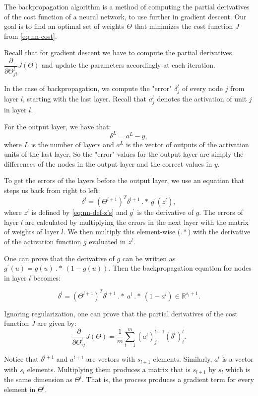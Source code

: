 \documentclass[a4paper,11pt]{report}
\begin{document}
The backpropagation algorithm is a method of computing the partial derivatives of the cost function of a neural network, to use further in gradient descent. Our goal is to find an optimal set of weights $\Theta$ that minimizes the cost function $J$ from \eqref{eq:nn-cost}.

Recall that for gradient descent we have to compute the partial derivatives $\dfrac{\partial}{\partial\Theta^l_{ji}}J(\Theta)$ and update the parameters accordingly at each iteration.

In the case of backpropagation, we compute the "error" $\delta_j^{l}$ of every node $j$ from layer $l$, starting with the last layer. Recall that $a_j^l$ denotes the activation of unit $j$ in layer $l$.

For the output layer, we have that: $$\delta^{L} = a^{L} - y,$$
where $L$ is the number of layers and $a^{L}$ is the vector of outputs of the activation units of the last layer. So the "error" values for the output layer are simply the differences of the nodes in the output layer and the correct values in $y$.

To get the errors of the layers before the output layer, we use an equation that steps us back from right to left:
$$\delta^{l} = (\Theta^{l+1})^T \delta^{l+1}\ .*\ g^\prime(z^{l}),$$
where $z^l$ is defined by \eqref{eq:nn-def-z's} and $g^\prime$ is the derivative of $g$.
The errors of layer $l$ are calculated by multiplying the errors in the next layer with the matrix of weights of layer $l$. We then multiply this element-wise ($.*$) with the derivative of the activation function $g$ evaluated in $z^l$.

One can prove that the derivative of $g$ can be written as $g^\prime(u) = g(u)\ .*\ (1 - g(u))$. Then the backpropagation equation for nodes in layer $l$ becomes:

\begin{equation}\label{eq:nn-bkprp-eq}
\delta^{l} = (\Theta^{l+1})^T \delta^{l+1}\ .*\ a^{l}\ .*\ (1 - a^{l})\in \mathbb{R}^{s_l+1}.
\end{equation}

Ignoring regularization, one can prove that the partial derivatives of the cost function $J$ are given by:
\begin{equation}\label{eq:nn-cost-deriv}
\dfrac{\partial}{\partial \Theta_{ij}^{l}}{J(\Theta)} = \dfrac{1}{m}\sum_{t=1}^m (a^t)_j^{l-1} (\delta^t)_i^{l}.
\end{equation}

Notice that $\delta^{l+1}$  and $a^{l+1}$ are vectors with $s_{l+1}$ elements. Similarly, $a^{l}$ is a vector with $s_l$ elements. Multiplying them produces a matrix that is $s_{l+1}$ by $s_l$ which is the same dimension as $\Theta^l$. That is, the process produces a gradient term for every element in $\Theta^l$.
\end{document}
